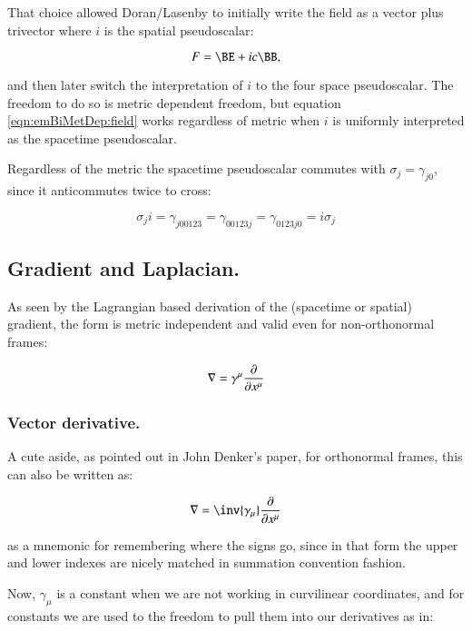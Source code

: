 That choice allowed Doran/Lasenby to initially write the field as a vector plus trivector where $i$ is the spatial pseudoscalar:

\begin{equation}\label{eqn:emBiMetDep:field}
F = \BE + i c \BB,
\end{equation}

and then later switch the interpretation of $i$ to the four space pseudoscalar.  The freedom to do so is metric dependent freedom, but
equation \ref{eqn:emBiMetDep:field} works regardless of metric when $i$ is uniformly interpreted as the spacetime pseudoscalar.

Regardless of the metric the spacetime pseudoscalar commutes with $\sigma_j = \gamma_{j0}$, since it anticommutes twice to cross:

\begin{equation*}
\sigma_j i = \gamma_{j00123} = \gamma_{00123j} = \gamma_{0123j0} = i \sigma_j
\end{equation*}

\subsection{Gradient and Laplacian. }

As seen by the Lagrangian based derivation of the (spacetime or spatial) gradient, the form is metric independent and valid even for non-orthonormal frames:

\begin{equation*}
\nabla = \gamma^{\mu} \frac{\partial {}}{\partial {x^{\mu}}}
\end{equation*}

\subsubsection{Vector derivative. }

A cute aside, as pointed out in John Denker's paper, for orthonormal frames, this can also be written as:

\begin{equation}\label{eqn:emBiMetDep:gradient}
\grad = \inv{\gamma_{\mu}} \PD{x^{\mu}}{}
\end{equation}

as a mnemonic for remembering where the signs go, since in that form the upper and lower indexes are nicely matched in summation convention fashion.

Now, $\gamma_{\mu}$ is a constant when we are not working in curvilinear coordinates, and for constants we are used to the freedom to pull them into our
derivatives as in:

